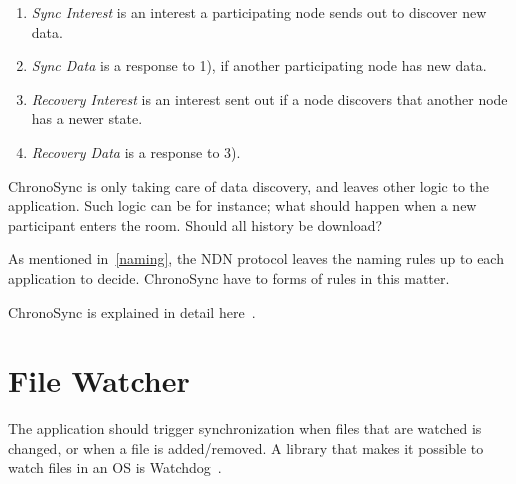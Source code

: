 \begin{enumerate}
  \item \textit{Sync Interest} is an interest a participating node sends out to discover new data.
  \item \textit{Sync Data} is a response to 1), if another participating node has new data.
  \item \textit{Recovery Interest} is an interest sent out if a node discovers that another node has a newer state.
  \item \textit{Recovery Data} is a response to 3).
\end{enumerate}

ChronoSync is only taking care of data discovery, and leaves other logic to the application. 
Such logic can be for instance; what should happen when a new participant enters the room.
Should all history be download?

As mentioned in~\autoref{naming}, the \gls{NDN} protocol leaves the naming rules up to each application to decide.
ChronoSync have to forms of rules in this matter. 

ChronoSync is explained in detail here~\cite{DBLP:conf/icnp/ZhuA13}.

\section{File Watcher}
The application should trigger synchronization when files that are watched is changed, or when a file is added/removed.
A library that makes it possible to watch files in an \gls{OS} is Watchdog~\cite{watchdog}. 
